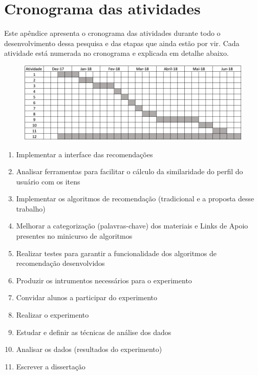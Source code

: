 \chapter{Cronograma das atividades}\label{ape:cronograma}

Este apêndice apresenta o cronograma das atividades durante todo o desenvolvimento dessa pesquisa e das etapas que ainda
estão por vir. Cada atividade está numerada no cronograma e explicada em detalhe abaixo.

\begin{figure}[htb]
  \begin{center}
      \includegraphics[scale=0.45]{./Figuras/cronograma.png}
  \end{center}
\end{figure}

\begin{enumerate}
\item Implementar a interface das recomendações
\item Analisar ferramentas para facilitar o cálculo da similaridade do perfil do usuário com os itens
\item Implementar os algoritmos de recomendação (tradicional e a proposta desse trabalho)
\item Melhorar a categorização (palavras-chave) dos materiais e Links de Apoio presentes no minicurso de algoritmos
\item Realizar testes para garantir a funcionalidade dos algoritmos de recomendação desenvolvidos
\item Produzir os intrumentos necessários para o experimento
\item Convidar alunos a participar do experimento
\item Realizar o experimento
\item Estudar e definir as técnicas de análise dos dados
\item Analisar os dados (resultados do experimento)
\item Escrever a dissertação
\end{enumerate}
